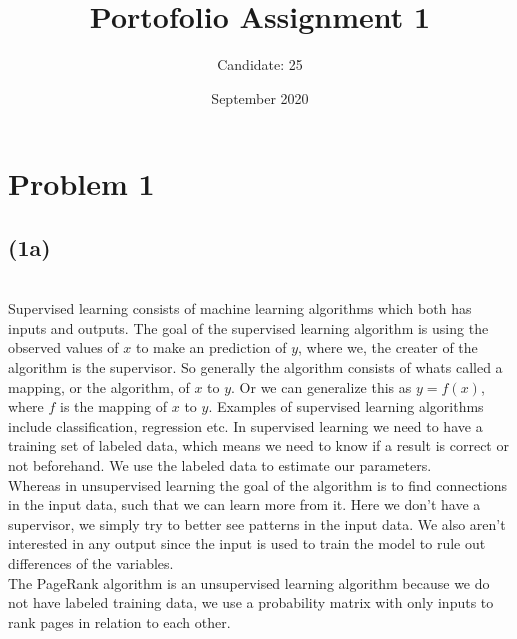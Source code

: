 \documentclass[12pt, letterpaper]{article}
\title{Portofolio Assignment 1}
\author{Candidate: 25}
\date{September 2020}
\begin{document}
  \maketitle
  \thispagestyle{fancy}
  \section*{Problem 1}
    \subsection*{(1a)} \\
      Supervised learning consists of machine learning algorithms which both has inputs and outputs. The goal of the supervised learning algorithm is using the observed values of $x$ to make an prediction of $y$, where we, the creater of the algorithm is the supervisor. So generally the algorithm consists of whats called a mapping, or the algorithm, of $x$ to $y$. Or we can generalize this as $y = f(x)$, where $f$ is the mapping of $x$ to $y$. Examples of supervised learning algorithms include classification, regression etc. In supervised learning we need to have a training set of labeled data, which means we need to know if a result is correct or not beforehand. We use the labeled data to estimate our parameters.\\
      \newline
      Whereas in unsupervised learning the goal of the algorithm is to find connections in the input data, such that we can learn more from it. Here we don't have a supervisor, we simply try to better see patterns in the input data. We also aren't interested in any output since the input is used to train the model to rule out differences of the variables.\\
      \newline
      The PageRank algorithm is an unsupervised learning algorithm because we do not have labeled training data, we use a probability matrix with only inputs to rank pages in relation to each other.
      \newline
\end{document}
